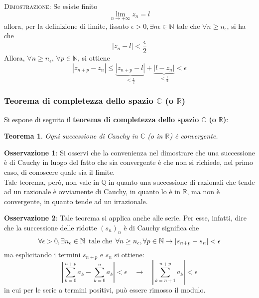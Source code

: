 \documentclass[a4paper]{extarticle}
\newtheorem{theorem}{Teorema}[section]
\begin{document}
\vspace{2em}
\noindent
\normalfont \normalsize
\textsc{Dimostrazione}: Se esiste finito
\[\lim_{n \to +\infty} z_n = l\]
allora, per la definizione di limite, fissato $\epsilon > 0, \exists n \epsilon \in \mathbb{N}$ tale che $\forall n \geq n_\epsilon$, si ha che
\[\left \vert z_n - l \right \vert < \frac{\epsilon}{2}\]
Allora, $\forall n \geq n_\epsilon$, $\forall p \in \mathbb{N}$, si ottiene
\[\left \vert z_{n+p} - z_n \right \vert \leq \underbrace{\left \vert z_{n+p} - l\right \vert}_{< \frac{\epsilon}{2}} + \underbrace{\left \vert l - z_n\right \vert}_{< \frac{\epsilon}{2}} < \epsilon\]

\vspace{1em}
\noindent
\subsubsection{Teorema di completezza dello spazio $\mathbb{C}$ (o $\mathbb{R}$)}
Si espone di seguito il \textbf{teorema di completezza dello spazio $\mathbb{C}$ (o $\mathbb{R}$)}:

\vspace{1em}
\noindent
\begin{theorem}
    Ogni successione di Cauchy in $\mathbb{C}$ (o in $\mathbb{R}$) è convergente.
\end{theorem}

\vspace{1em}
\noindent
\textbf{Osservazione 1}: Si osservi che la convenienza nel dimostrare che una successione è di Cauchy in luogo del fatto che sia convergente è che non si richiede, nel primo caso, di conoscere quale sia il limite.\\
Tale teorema, però, non vale in $\mathbb{Q}$ in quanto una successione di razionali che tende ad un razionale è ovviamente di Cauchy, in quanto lo è in $\mathbb{R}$, ma non è convergente, in quanto tende ad un irrazionale.

\vspace{2em}
\noindent
\textbf{Osservazione 2}: Tale teorema si applica anche alle serie. Per esse, infatti, dire che la successione delle ridotte $(s_n)_n$ è di Cauchy significa che
\[\forall \epsilon > 0, \exists n_\epsilon \in \mathbb{N} \hspace{0.5em} \text{tale che} \hspace{0.5em} \forall n \geq n_\epsilon, \forall p \in \mathbb{N} \rightarrow \left \vert s_{n+p} - s_n \right \vert < \epsilon\]
ma esplicitando i termini $s_{n+p}$ e $s_n$ si ottiene:
\[\left \vert \sum_{k=0}^{n+p} a_k - \sum_{k=0}^n a_k \right \vert < \epsilon \hspace{1em} \rightarrow \hspace{1em} \left \vert \sum_{k=n+1}^{n+p} a_k \right \vert < \epsilon\]
in cui per le serie a termini positivi, può essere rimosso il modulo.
\end{document}
